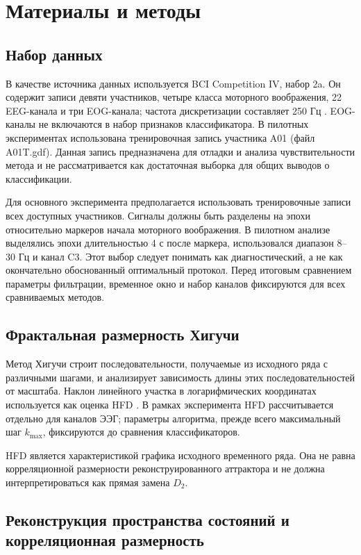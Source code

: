 \section{Материалы и методы}

\subsection{Набор данных}

В качестве источника данных используется BCI Competition IV, набор 2a. Он содержит записи девяти участников, четыре класса моторного воображения, 22 EEG-канала и три EOG-канала; частота дискретизации составляет 250 Гц \cite{Tangermann2012,BCICompetitionIV}. EOG-каналы не включаются в набор признаков классификатора. В пилотных экспериментах использована тренировочная запись участника A01 (файл A01T.gdf). Данная запись предназначена для отладки и анализа чувствительности метода и не рассматривается как достаточная выборка для общих выводов о классификации.

Для основного эксперимента предполагается использовать тренировочные записи всех доступных участников. Сигналы должны быть разделены на эпохи относительно маркеров начала моторного воображения. В пилотном анализе выделялись эпохи длительностью 4 с после маркера, использовался диапазон 8--30 Гц и канал C3. Этот выбор следует понимать как диагностический, а не как окончательно обоснованный оптимальный протокол. Перед итоговым сравнением параметры фильтрации, временное окно и набор каналов фиксируются для всех сравниваемых методов.

\subsection{Фрактальная размерность Хигучи}

Метод Хигучи строит последовательности, получаемые из исходного ряда с различными шагами, и анализирует зависимость длины этих последовательностей от масштаба. Наклон линейного участка в логарифмических координатах используется как оценка HFD \cite{Higuchi1988}. В рамках эксперимента HFD рассчитывается отдельно для каналов ЭЭГ; параметры алгоритма, прежде всего максимальный шаг $k_{\max}$, фиксируются до сравнения классификаторов.

HFD является характеристикой графика исходного временного ряда. Она не равна корреляционной размерности реконструированного аттрактора и не должна интерпретироваться как прямая замена $D_2$.

\subsection{Реконструкция пространства состояний и корреляционная размерность}

